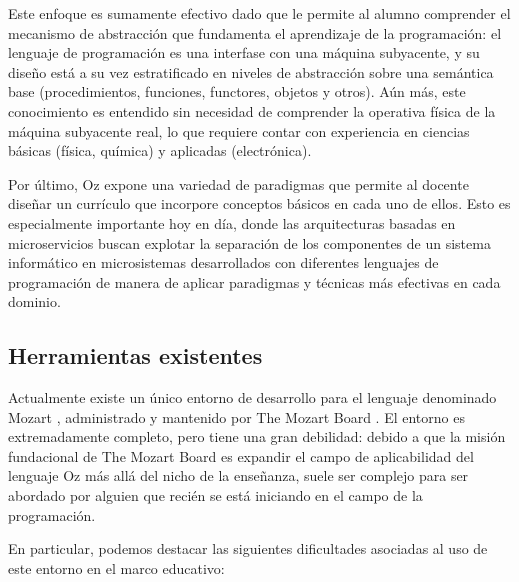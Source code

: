 \documentclass[a4paper,11pt]{article}
\begin{document}
Este enfoque es sumamente efectivo dado que le permite al alumno comprender el
mecanismo de abstracción que fundamenta el aprendizaje de la programación: el
lenguaje de programación es una interfase con una máquina subyacente, y su
diseño está a su vez estratificado en niveles de abstracción sobre una
semántica base (procedimientos, funciones, functores, objetos y otros). Aún
más, este conocimiento es entendido sin necesidad de comprender la operativa
física de la máquina subyacente real, lo que requiere contar con experiencia en
ciencias básicas (física, química) y aplicadas (electrónica).

Por último, Oz \cite{oz} expone una variedad de paradigmas que permite al
docente diseñar un currículo que incorpore conceptos básicos en cada uno de
ellos. Esto es especialmente importante hoy en día, donde las arquitecturas
basadas en microservicios buscan explotar la separación de los componentes de
un sistema informático en microsistemas desarrollados con diferentes lenguajes
de programación de manera de aplicar paradigmas y técnicas más efectivas en
cada dominio.

\subsection{Herramientas existentes}

Actualmente existe un único entorno de desarrollo para el lenguaje denominado
Mozart \cite{mozart}, administrado y mantenido por The Mozart Board
\cite{mozboard}. El entorno es extremadamente completo, pero tiene una gran
debilidad: debido a que la misión fundacional de The Mozart Board es expandir
el campo de aplicabilidad del lenguaje Oz más allá del nicho de la enseñanza,
suele ser complejo para ser abordado por alguien que recién se está iniciando
en el campo de la programación.

En particular, podemos destacar las siguientes dificultades asociadas al uso de
este entorno en el marco educativo:
\end{document}
